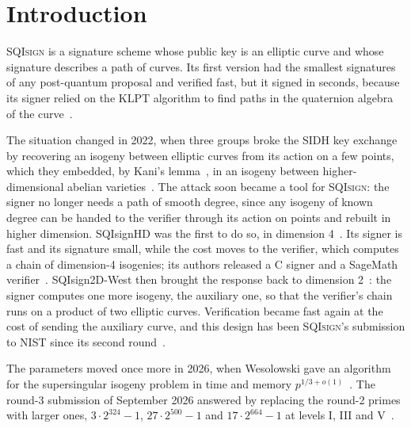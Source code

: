 \documentclass[version=preprint]{iacrcc}
\newcommand{\SQIsign}{SQI{\textsc{sign}}}
\begin{document}
    \section{Introduction}

    {\SQIsign} is a signature scheme whose public key is an elliptic curve and
    whose signature describes a path of curves. Its first version had the
    smallest signatures of any post-quantum proposal and verified fast, but it
    signed in seconds, because its signer relied on the KLPT algorithm to find
    paths in the quaternion algebra of the curve~\cite{FKL+20}.

    The situation changed in 2022, when three groups broke the SIDH key
    exchange by recovering an isogeny between elliptic curves from its action
    on a few points, which they embedded, by Kani's lemma~\cite{Kan97}, in an
    isogeny between higher-dimensional abelian
    varieties~\cite{CD23,MMP+23,Rob23}. The attack soon became a tool for
    {\SQIsign}: the signer no longer needs a path of smooth degree, since any
    isogeny of known degree can be handed to the verifier through its action
    on points and rebuilt in higher dimension. SQIsignHD was the first to do
    so, in dimension 4~\cite{DLRW24}. Its signer is fast and its signature
    small, while the cost moves to the verifier, which computes a chain of
    dimension-4 isogenies; its authors released a C signer and a SageMath
    verifier~\cite{DLRW25}. SQIsign2D-West then brought the response back to
    dimension 2~\cite{BDF+24}: the signer computes one more isogeny, the
    auxiliary one, so that the verifier's chain runs on a product of two
    elliptic curves. Verification became fast again at the cost of sending the
    auxiliary curve, and this design has been {\SQIsign}'s submission to NIST
    since its second round~\cite{AAA+25,AAA+26}.

    The parameters moved once more in 2026, when Wesolowski gave an algorithm
    for the supersingular isogeny problem in time and memory
    $p^{1/3+o(1)}$~\cite{Wes26}. The round-3 submission of September 2026
    answered by replacing the round-2 primes with larger ones, $3 \cdot 2^{324}
    - 1$, $27 \cdot 2^{500} - 1$ and $17 \cdot 2^{664} - 1$ at levels I, III
    and V~\cite{AAA+26}.
\end{document}
